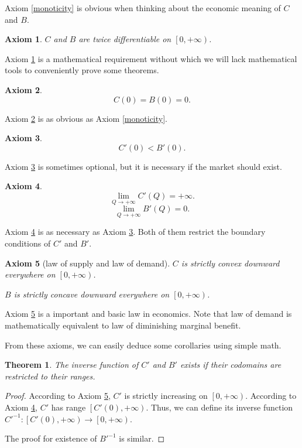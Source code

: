 \documentclass{article}
\newtheorem{axiom}{Axiom}
\newtheorem{theorem}{Theorem}
\begin{document}
Axiom \ref{monoticity} is obvious when thinking about the economic meaning of $C$ and $B$.

\begin{axiom}
\label{smoothness}
$C$ and $B$ are twice differentiable on $\left[0,+\infty\right)$.
\end{axiom}

Axiom \ref{smoothness} is a mathematical requirement
without which we will lack mathematical tools to conveniently prove some theorems.

\begin{axiom}
\label{initial cost and benefit}
$$C\left(0\right)=B\left(0\right)=0.$$
\end{axiom}

Axiom \ref{initial cost and benefit} is as obvious as Axiom \ref{monoticity}.

\begin{axiom}
\label{initial supply and demand}
$$C'\left(0\right)<B'\left(0\right).$$
\end{axiom}

Axiom \ref{initial supply and demand} is sometimes optional,
but it is necessary if the market should exist.

\begin{axiom}
\label{inf}
$$\lim_{Q\to+\infty}C'\left(Q\right)=+\infty.$$
$$\lim_{Q\to+\infty}B'\left(Q\right)=0.$$
\end{axiom}

Axiom \ref{inf} is as necessary as Axiom \ref{initial supply and demand}.
Both of them restrict the boundary conditions of $C'$ and $B'$.

\begin{axiom}[law of supply and law of demand]
\label{law of supply and demand}
$C$ is strictly convex downward everywhere on $\left[0,+\infty\right)$.

$B$ is strictly concave downward everywhere on $\left[0,+\infty\right)$.
\end{axiom}

Axiom \ref{law of supply and demand} is a important and basic law in economics.
Note that law of demand is mathematically equivalent to law of diminishing marginal benefit.

From these axioms, we can easily deduce some corollaries using simple math.

\begin{theorem}
The inverse function of $C'$ and $B'$ exists if their codomains are restricted to their ranges.
\end{theorem}
\begin{proof}
According to Axiom \ref{law of supply and demand}, $C'$ is strictly increasing on $\left[0,+\infty\right)$.
According to Axiom \ref{inf}, $C'$ has range $\left[C'\left(0\right),+\infty\right)$.
Thus, we can define its inverse function $C'^{-1}:\left[C'\left(0\right),+\infty\right)\to\left[0,+\infty\right)$.

The proof for existence of $B'^{-1}$ is similar.
\end{proof}
\end{document}
